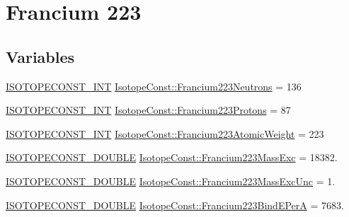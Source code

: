 \hypertarget{group___isotope_const-_francium-_fr223}{}\section{Francium 223}
\label{group___isotope_const-_francium-_fr223}
\subsection*{Variables}
\begin{DoxyCompactItemize}
\item 
\mbox{\hyperlink{group___isotope_const-_macros_ga5f18360b3e99483a35c32d789e62621c}{I\+S\+O\+T\+O\+P\+E\+C\+O\+N\+S\+T\+\_\+\+I\+NT}} \mbox{\hyperlink{group___isotope_const-_francium-_fr223_ga70e686daf9aa2d08dc565a1cffb10d00}{Isotope\+Const\+::\+Francium223\+Neutrons}} = 136
\item 
\mbox{\hyperlink{group___isotope_const-_macros_ga5f18360b3e99483a35c32d789e62621c}{I\+S\+O\+T\+O\+P\+E\+C\+O\+N\+S\+T\+\_\+\+I\+NT}} \mbox{\hyperlink{group___isotope_const-_francium-_fr223_gae2969e4bd4cb16bd9b59349f22cb2c62}{Isotope\+Const\+::\+Francium223\+Protons}} = 87
\item 
\mbox{\hyperlink{group___isotope_const-_macros_ga5f18360b3e99483a35c32d789e62621c}{I\+S\+O\+T\+O\+P\+E\+C\+O\+N\+S\+T\+\_\+\+I\+NT}} \mbox{\hyperlink{group___isotope_const-_francium-_fr223_ga98a0b7680e6ecd770d59c18386baf03c}{Isotope\+Const\+::\+Francium223\+Atomic\+Weight}} = 223
\item 
\mbox{\hyperlink{group___isotope_const-_macros_ga8f45a7272ce02c0b4c65c44636ed719a}{I\+S\+O\+T\+O\+P\+E\+C\+O\+N\+S\+T\+\_\+\+D\+O\+U\+B\+LE}} \mbox{\hyperlink{group___isotope_const-_francium-_fr223_ga3b0e064faa8f2a4372383a56132e0f5d}{Isotope\+Const\+::\+Francium223\+Mass\+Exc}} = 18382.
\item 
\mbox{\hyperlink{group___isotope_const-_macros_ga8f45a7272ce02c0b4c65c44636ed719a}{I\+S\+O\+T\+O\+P\+E\+C\+O\+N\+S\+T\+\_\+\+D\+O\+U\+B\+LE}} \mbox{\hyperlink{group___isotope_const-_francium-_fr223_ga5cfb08d0794e74ffe8cdfe5582f4e9ba}{Isotope\+Const\+::\+Francium223\+Mass\+Exc\+Unc}} = 1.
\item 
\mbox{\hyperlink{group___isotope_const-_macros_ga8f45a7272ce02c0b4c65c44636ed719a}{I\+S\+O\+T\+O\+P\+E\+C\+O\+N\+S\+T\+\_\+\+D\+O\+U\+B\+LE}} \mbox{\hyperlink{group___isotope_const-_francium-_fr223_gabcaa050a472012d0e1bbf045b226fa18}{Isotope\+Const\+::\+Francium223\+Bind\+E\+PerA}} = 7683.
\item 

\end{DoxyCompactItemize}
